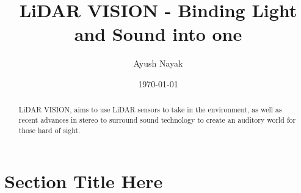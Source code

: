 \documentclass{article}
\begin{document}
\title{LiDAR VISION - Binding Light and Sound into one}
\author{Ayush Nayak}
\date{\today}

\maketitle

\begin{abstract}
    LiDAR VISION, aims to use LiDAR sensors to take in the environment, as well as recent advances in stereo to surround sound technology to create an auditory world for those hard of sight.
\end{abstract}

\newpage

\section{Section Title Here}
\end{document}
